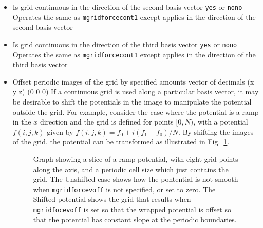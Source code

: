 \begin{itemize}
\item
{}
{Is grid continuous in the direction of the second basis vector}
{{\tt yes} or {\tt no}}{{\tt no}}
{Operates the same as {\tt mgridforcecont1} except applies in the direction of the second basis vector}

\item
{}
{Is grid continuous in the direction of the third basis vector}
{{\tt yes} or {\tt no}}{{\tt no}}
{Operates the same as {\tt mgridforcecont1} except applies in the direction of the third basis vector}

\item
{}
{Offset periodic images of the grid by specified amounts}
{vector of decimals (x y z)}
{(0 0 0)}
{If a continuous grid is used along a particular basis vector, it may be desirable to shift the potentials in the image to manipulate the potential outside the grid. For example, consider the case where the potential is a ramp in the $x$ direction and the grid is defined for points $[0,N)$, with a potential $f(i,j,k)$ given by $f(i,j,k) = f_0 + i (f_1-f_0) / N$. By shifting the images of the grid, the potential can be transformed as illustrated in Fig.~\ref{fig:gridshift}.
}

\begin{figure}[htb]
  \caption[Graph showing a slice of a ramp potential, showing the effect of 
           {\tt mgridforcevoff}]
  {\small Graph showing a slice of a ramp potential, with eight grid points along the axis, and a periodic cell size which just contains the grid. The Unshifted case shows how the pontential is not smooth when {\tt mgridforcevoff} is not specified, or set to zero. The Shifted potential shows the grid that results when {\tt mgridfocevoff} is set so that the wrapped potential is offset so that the potential has constant slope at the periodic boundaries.}
  \label{fig:gridshift}
\end{figure}


\end{itemize}
